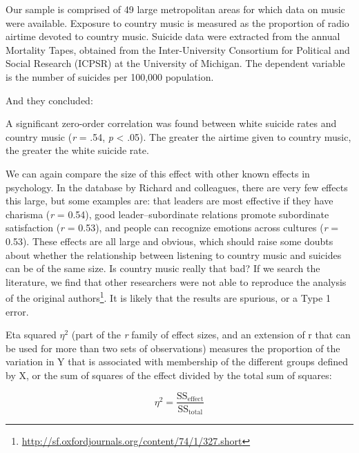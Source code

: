 \documentclass[
  oneside]{krantz}
\renewenvironment{quote}{\begin{VF}}{\end{VF}}
\renewcommand{\href}[2]{#2\footnote{\url{#1}}}
\begin{document}
\begin{quote}
Our sample is comprised of 49 large metropolitan areas for which data on music were available. Exposure to country music is measured as the proportion of radio airtime devoted to country music. Suicide data were extracted from the annual Mortality Tapes, obtained from the Inter-University Consortium for Political and Social Research (ICPSR) at the University of Michigan. The dependent variable is the number of suicides per 100,000 population.
\end{quote}

And they concluded:

\begin{quote}
A significant zero-order correlation was found between white suicide rates and country music (\emph{r} = .54, \emph{p} \textless{} .05). The greater the airtime given to country music, the greater the white suicide rate.
\end{quote}

We can again compare the size of this effect with other known effects in psychology. In the database by Richard and colleagues, there are very few effects this large, but some examples are: that leaders are most effective if they have charisma (\emph{r} = 0.54), good leader--subordinate relations promote subordinate satisfaction (\emph{r} = 0.53), and people can recognize emotions across cultures (\emph{r} = 0.53). These effects are all large and obvious, which should raise some doubts about whether the relationship between listening to country music and suicides can be of the same size. Is country music really that bad? If we search the literature, we find that \href{http://sf.oxfordjournals.org/content/74/1/327.short}{other researchers were not able to reproduce the analysis of the original authors}. It is likely that the results are spurious, or a Type 1 error.

Eta squared \(\eta^2\) (part of the \emph{r} family of effect sizes, and an extension of r that can be used for more than two sets of observations) measures the proportion of the variation in Y that is associated with membership of the different groups defined by X, or the sum of squares of the effect divided by the total sum of squares:

\[\eta^{2} = \frac{\text{SS}_{\text{effect}}}{\text{SS}_{\text{total}}}\]
\end{document}
